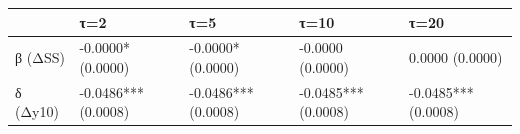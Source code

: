 \begin{tabular}{lllll}
\toprule
 & τ=2 & τ=5 & τ=10 & τ=20 \\
\midrule
β (ΔSS) & -0.0000*
(0.0000) & -0.0000*
(0.0000) & -0.0000
(0.0000) & 0.0000
(0.0000) \\
δ (Δy10) & -0.0486***
(0.0008) & -0.0486***
(0.0008) & -0.0485***
(0.0008) & -0.0485***
(0.0008) \\
\bottomrule
\end{tabular}
